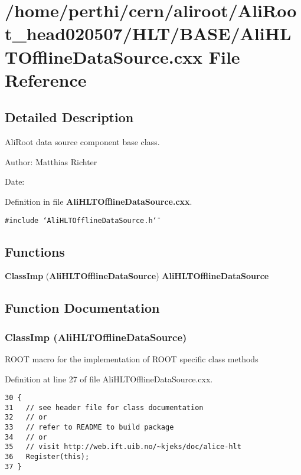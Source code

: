 \section{/home/perthi/cern/aliroot/Ali\-Root\_\-head020507/HLT/BASE/Ali\-HLTOffline\-Data\-Source.cxx File Reference}
\label{AliHLTOfflineDataSource_8cxx}


\subsection{Detailed Description}
Ali\-Root data source component base class. 

\begin{Desc}
\item[Author:]Matthias Richter \end{Desc}
\begin{Desc}
\item[Date:]\end{Desc}


Definition in file {\bf Ali\-HLTOffline\-Data\-Source.cxx}.

{\tt \#include \char`\"{}Ali\-HLTOffline\-Data\-Source.h\char`\"{}}\par
\subsection*{Functions}
\begin{CompactItemize}
\item 
{\bf Class\-Imp} ({\bf Ali\-HLTOffline\-Data\-Source}) {\bf Ali\-HLTOffline\-Data\-Source}
\end{CompactItemize}


\subsection{Function Documentation}
\subsubsection{\setlength{\rightskip}{0pt plus 5cm}Class\-Imp ({\bf Ali\-HLTOffline\-Data\-Source})}\label{AliHLTOfflineDataSource_8cxx_a0}


ROOT macro for the implementation of ROOT specific class methods 

Definition at line 27 of file Ali\-HLTOffline\-Data\-Source.cxx.

\footnotesize\begin{verbatim}30 {
31   // see header file for class documentation
32   // or
33   // refer to README to build package
34   // or
35   // visit http://web.ift.uib.no/~kjeks/doc/alice-hlt
36   Register(this);
37 }
\end{verbatim}\normalsize 


